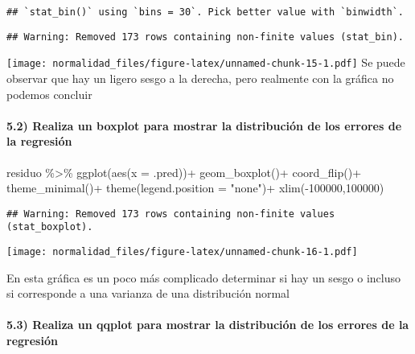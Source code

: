 \documentclass[
]{article}
\newenvironment{Shaded}{\begin{snugshade}}{\end{snugshade}}
\newcommand{\AttributeTok}[1]{\textcolor[rgb]{0.77,0.63,0.00}{#1}}
\newcommand{\DecValTok}[1]{\textcolor[rgb]{0.00,0.00,0.81}{#1}}
\newcommand{\FunctionTok}[1]{\textcolor[rgb]{0.00,0.00,0.00}{#1}}
\newcommand{\NormalTok}[1]{#1}
\newcommand{\SpecialCharTok}[1]{\textcolor[rgb]{0.00,0.00,0.00}{#1}}
\newcommand{\StringTok}[1]{\textcolor[rgb]{0.31,0.60,0.02}{#1}}
\begin{document}
\begin{verbatim}
## `stat_bin()` using `bins = 30`. Pick better value with `binwidth`.
\end{verbatim}

\begin{verbatim}
## Warning: Removed 173 rows containing non-finite values (stat_bin).
\end{verbatim}

\texttt{[image: normalidad\_files/figure-latex/unnamed-chunk-15-1.pdf]}
Se puede observar que hay un ligero sesgo a la derecha, pero realmente
con la gráfica no podemos concluir

\hypertarget{realiza-un-boxplot-para-mostrar-la-distribuciuxf3n-de-los-errores-de-la-regresiuxf3n}{%
\paragraph{5.2) Realiza un boxplot para mostrar la distribución de los
errores de la
regresión}\label{realiza-un-boxplot-para-mostrar-la-distribuciuxf3n-de-los-errores-de-la-regresiuxf3n}}

\begin{Shaded}
\begin{Highlighting}[]
\NormalTok{residuo }\SpecialCharTok{\%\textgreater{}\%} 
  \FunctionTok{ggplot}\NormalTok{(}\FunctionTok{aes}\NormalTok{(}\AttributeTok{x =}\NormalTok{ .pred))}\SpecialCharTok{+}
  \FunctionTok{geom\_boxplot}\NormalTok{()}\SpecialCharTok{+}
  \FunctionTok{coord\_flip}\NormalTok{()}\SpecialCharTok{+}
  \FunctionTok{theme\_minimal}\NormalTok{()}\SpecialCharTok{+}
  \FunctionTok{theme}\NormalTok{(}\AttributeTok{legend.position =} \StringTok{"none"}\NormalTok{)}\SpecialCharTok{+}
  \FunctionTok{xlim}\NormalTok{(}\SpecialCharTok{{-}}\DecValTok{100000}\NormalTok{,}\DecValTok{100000}\NormalTok{)}
\end{Highlighting}
\end{Shaded}

\begin{verbatim}
## Warning: Removed 173 rows containing non-finite values (stat_boxplot).
\end{verbatim}

\texttt{[image: normalidad\_files/figure-latex/unnamed-chunk-16-1.pdf]}

En esta gráfica es un poco más complicado determinar si hay un sesgo o
incluso si corresponde a una varianza de una distribución normal

\hypertarget{realiza-un-qqplot-para-mostrar-la-distribuciuxf3n-de-los-errores-de-la-regresiuxf3n}{%
\paragraph{5.3) Realiza un qqplot para mostrar la distribución de los
errores de la
regresión}\label{realiza-un-qqplot-para-mostrar-la-distribuciuxf3n-de-los-errores-de-la-regresiuxf3n}}
\end{document}
